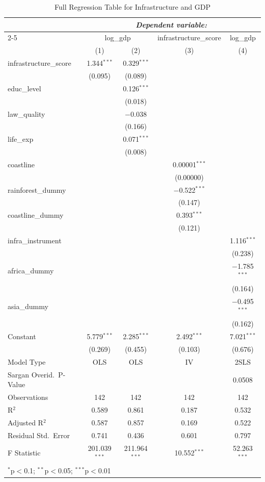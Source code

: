 \documentclass[12pt,a4paper]{article}
\begin{document}
\begin{table}[H]
\centering
\caption{Full Regression Table for Infrastructure and GDP}
\label{fig:regtable}
\begin{tabular}{lcccc}
\toprule
 & \multicolumn{4}{c}{\textit{Dependent variable:}} \\
\cmidrule(lr){2-5}
 & \multicolumn{2}{c}{log\_gdp} & infrastructure\_score & log\_gdp \\
 & (1) & (2) & (3) & (4) \\
\midrule
infrastructure\_score & 1.344$^{***}$ & 0.329$^{***}$ & & \\
 & (0.095) & (0.089) & & \\[4pt]
educ\_level & & 0.126$^{***}$ & & \\
 & & (0.018) & & \\[4pt]
law\_quality & & $-$0.038 & & \\
 & & (0.166) & & \\[4pt]
life\_exp & & 0.071$^{***}$ & & \\
 & & (0.008) & & \\[4pt]
coastline & & & 0.00001$^{***}$ & \\
 & & & (0.00000) & \\[4pt]
rainforest\_dummy & & & $-$0.522$^{***}$ & \\
 & & & (0.147) & \\[4pt]
coastline\_dummy & & & 0.393$^{***}$ & \\
 & & & (0.121) & \\[4pt]
infra\_instrument & & & & 1.116$^{***}$ \\
 & & & & (0.238) \\[4pt]
africa\_dummy & & & & $-$1.785$^{***}$ \\
 & & & & (0.164) \\[4pt]
asia\_dummy & & & & $-$0.495$^{***}$ \\
 & & & & (0.162) \\[4pt]
Constant & 5.779$^{***}$ & 2.285$^{***}$ & 2.492$^{***}$ & 7.021$^{***}$ \\
 & (0.269) & (0.455) & (0.103) & (0.676) \\
\midrule
Model Type & OLS & OLS & IV & 2SLS \\
Sargan Overid.\ P-Value & & & & 0.0508 \\
Observations & 142 & 142 & 142 & 142 \\
R$^2$ & 0.589 & 0.861 & 0.187 & 0.532 \\
Adjusted R$^2$ & 0.587 & 0.857 & 0.169 & 0.522 \\
Residual Std.\ Error & 0.741 & 0.436 & 0.601 & 0.797 \\
F Statistic & 201.039$^{***}$ & 211.964$^{***}$ & 10.552$^{***}$ & 52.263$^{***}$ \\
\bottomrule
\multicolumn{5}{l}{\footnotesize $^*$p$<$0.1; $^{**}$p$<$0.05; $^{***}$p$<$0.01} \\
\end{tabular}
\end{table}
\end{document}
